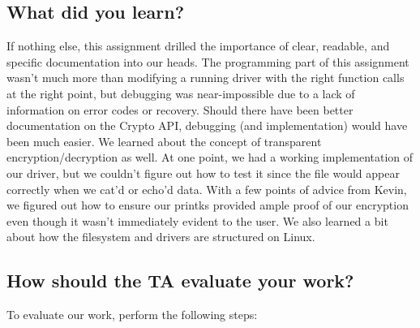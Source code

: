 \documentclass[letterpaper,10pt,titlepage]{article}
\begin{document}
\subsection{What did you learn?}

If nothing else, this assignment drilled the importance of clear, readable, and specific documentation into our heads. 
The programming part of this assignment wasn't much more than modifying a running driver with the right function calls at the right point, but debugging was near-impossible due to a lack of information on error codes or recovery.
Should there have been better documentation on the Crypto API, debugging (and implementation) would have been much easier. 
We learned about the concept of transparent encryption/decryption as well.
At one point, we had a working implementation of our driver, but we couldn't figure out how to test it since the file would appear correctly when we cat'd or echo'd data.
With a few points of advice from Kevin, we figured out how to ensure our printks provided ample proof of our encryption even though it wasn't immediately evident to the user.
We also learned a bit about how the filesystem and drivers are structured on Linux. 

\subsection{How should the TA evaluate your work?}
To evaluate our work, perform the following steps:
\end{document}
